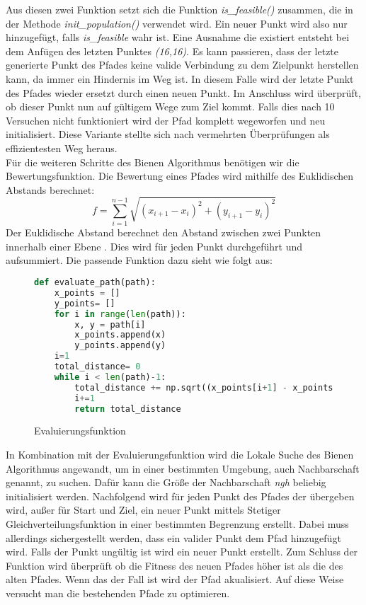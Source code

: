 Aus diesen zwei Funktion setzt sich die Funktion \emph{is\_feasible()} zusammen, die in der Methode \emph{init\_population()} verwendet wird. Ein neuer Punkt wird also nur hinzugefügt, falls \emph{is\_feasible} wahr ist. Eine Ausnahme die existiert entsteht bei dem Anfügen des letzten Punktes \emph{(16,16)}. Es kann passieren, dass der letzte generierte Punkt des Pfades keine valide Verbindung zu dem Zielpunkt herstellen kann, da immer ein Hindernis im Weg ist. In diesem Falle wird der letzte Punkt des Pfades wieder ersetzt durch einen neuen Punkt. Im Anschluss wird überprüft, ob dieser Punkt nun auf gültigem Wege zum Ziel kommt. Falls dies nach 10 Versuchen nicht funktioniert wird der Pfad komplett wegeworfen und neu initialisiert. Diese Variante stellte sich nach vermehrten Überprüfungen als effizientesten Weg heraus.\\

Für die weiteren Schritte des Bienen Algorithmus benötigen wir die Bewertungsfunktion. Die Bewertung eines Pfades wird mithilfe des Euklidischen Abstands berechnet:
\[f = \sum_{i=1}^{n-1} \sqrt{(x_{i+1} - x_i)^2 + (y_{i+1} - y_i)^2}\]\newpage Der Euklidische Abstand berechnet den Abstand zwischen zwei Punkten innerhalb einer Ebene \cite{Friedrich2019}. Dies wird für jeden Punkt durchgeführt und aufsummiert. Die passende Funktion dazu sieht wie folgt aus:

\begin{figure}[H]
    \begin{lstlisting}[language=python]
def evaluate_path(path):
    x_points = []
    y_points= []
    for i in range(len(path)):
        x, y = path[i]
        x_points.append(x)
        y_points.append(y)
    i=1
    total_distance= 0
    while i < len(path)-1:
        total_distance += np.sqrt((x_points[i+1] - x_points[i]) **2 + (y_points[i+1] - y_points[i])**2)
        i+=1
        return total_distance
    \end{lstlisting}
    \caption{Evaluierungsfunktion}
\end{figure}

In Kombination mit der Evaluierungsfunktion wird die Lokale Suche des Bienen Algorithmus angewandt, um in einer bestimmten Umgebung, auch Nachbarschaft genannt, zu suchen. Dafür kann die Größe der Nachbarschaft \emph{ngh} beliebig initialisiert werden. Nachfolgend wird für jeden Punkt des Pfades der übergeben wird, außer für Start und Ziel, ein neuer Punkt mittels Stetiger Gleichverteilungsfunktion in einer bestimmten Begrenzung erstellt. Dabei muss allerdings sichergestellt werden, dass ein valider Punkt dem Pfad hinzugefügt wird. Falls der Punkt ungültig ist wird ein neuer Punkt erstellt. Zum Schluss der Funktion wird überprüft ob die Fitness des neuen Pfades höher ist als die des alten Pfades. Wenn das der Fall ist wird der Pfad akualisiert. Auf diese Weise versucht man die bestehenden Pfade zu optimieren.   

